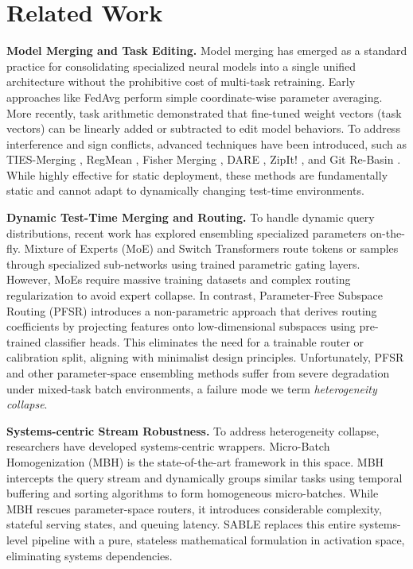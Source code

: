 \section{Related Work}
\label{sec:related}

\textbf{Model Merging and Task Editing.} Model merging has emerged as a standard practice for consolidating specialized neural models into a single unified architecture without the prohibitive cost of multi-task retraining. Early approaches like FedAvg \cite{mcmahan2017communication} perform simple coordinate-wise parameter averaging. More recently, task arithmetic \cite{ilharco2022editing, ortiz2020task} demonstrated that fine-tuned weight vectors (task vectors) can be linearly added or subtracted to edit model behaviors. To address interference and sign conflicts, advanced techniques have been introduced, such as TIES-Merging \cite{yadav2023ties}, RegMean \cite{jin2022regmean}, Fisher Merging \cite{matena2021merging}, DARE \cite{yu2023dare}, ZipIt! \cite{stoica2023zipit}, and Git Re-Basin \cite{ainsworth2022git}. While highly effective for static deployment, these methods are fundamentally static and cannot adapt to dynamically changing test-time environments.

\textbf{Dynamic Test-Time Merging and Routing.} To handle dynamic query distributions, recent work has explored ensembling specialized parameters on-the-fly. Mixture of Experts (MoE) \cite{shazeer2017outrageously} and Switch Transformers \cite{fedus2021switch} route tokens or samples through specialized sub-networks using trained parametric gating layers. However, MoEs require massive training datasets and complex routing regularization to avoid expert collapse. In contrast, Parameter-Free Subspace Routing (PFSR) \cite{pfsr} introduces a non-parametric approach that derives routing coefficients by projecting features onto low-dimensional subspaces using pre-trained classifier heads. This eliminates the need for a trainable router or calibration split, aligning with minimalist design principles. Unfortunately, PFSR and other parameter-space ensembling methods suffer from severe degradation under mixed-task batch environments, a failure mode we term \emph{heterogeneity collapse}.

\textbf{Systems-centric Stream Robustness.} To address heterogeneity collapse, researchers have developed systems-centric wrappers. Micro-Batch Homogenization (MBH) \cite{mbh} is the state-of-the-art framework in this space. MBH intercepts the query stream and dynamically groups similar tasks using temporal buffering and sorting algorithms to form homogeneous micro-batches. While MBH rescues parameter-space routers, it introduces considerable complexity, stateful serving states, and queuing latency. SABLE replaces this entire systems-level pipeline with a pure, stateless mathematical formulation in activation space, eliminating systems dependencies.

